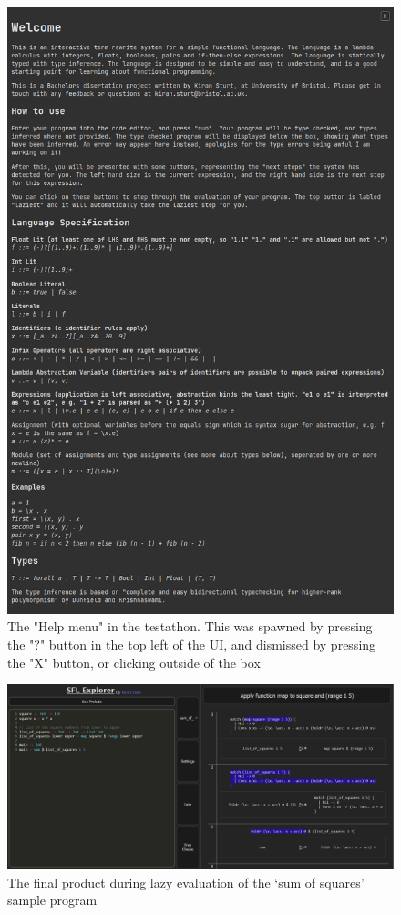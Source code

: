 \begin{figure}[h]
    \centering
    \includegraphics[width=0.9\linewidth]{images/testathon_help_menu_cropped.png} 
    \captionsetup{justification=centering}
    \caption{The "Help menu" in the testathon. This was spawned by pressing the "?" button in the top left of the UI, and dismissed by pressing the "X" button, or clicking outside of the box}
    \label{fig:screenshot_testathon_2}
\end{figure}

\begin{figure}[h]
    \centering
    \includegraphics[width=\linewidth]{images/final_dark.png} 
    \captionsetup{justification=centering}
    \caption{The final product during lazy evaluation of the `sum of squares' sample program}
    \label{fig:screenshot_final_dark}
\end{figure}

